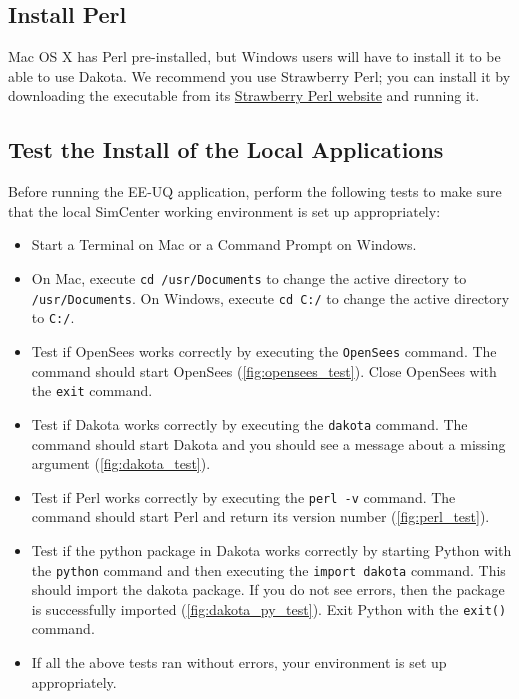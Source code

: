 \subsection{Install  Perl}

Mac OS X has Perl pre-installed, but Windows users will have to install it to be able to use  Dakota. We recommend you use Strawberry Perl; you can install it by downloading the executable from its \href{http://strawberryperl.com}{Strawberry Perl website} and running it.

\subsection{Test the Install of the Local Applications}

Before running the EE-UQ application, perform the following tests to make sure that the local SimCenter working environment is set up appropriately:

\begin{itemize}
    \item Start a Terminal on Mac or a Command Prompt on Windows.
    \item On Mac, execute \texttt{cd /usr/Documents} to change the active directory to \texttt{/usr/Documents}. On Windows, execute \texttt{cd C:/} to change the active directory to \texttt{C:/}.
    \item Test if OpenSees works correctly by executing the \texttt{OpenSees} command. The command should start OpenSees (\autoref{fig:opensees_test}). Close OpenSees with the \texttt{exit} command.
    \item Test if Dakota works correctly by executing the \texttt{dakota} command. The command should start Dakota and you should see a message about a missing argument (\autoref{fig:dakota_test}).
    \item Test if Perl works correctly by executing the \texttt{perl -v} command. The command should start Perl and return its version number (\autoref{fig:perl_test}).
    \item Test if the python package in Dakota works correctly by starting Python with the \texttt{python} command and then executing the \texttt{import dakota} command. This should import the dakota package. If you do not see errors, then the package is successfully imported (\autoref{fig:dakota_py_test}). Exit Python with the \texttt{exit()} command.
    \item If all the above tests ran without errors, your environment is set up appropriately.
\end{itemize}

